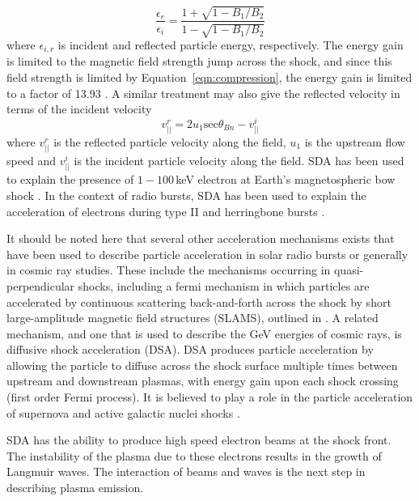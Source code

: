 \begin{equation}
\frac{\epsilon_r}{\epsilon_i} = \frac{1+\sqrt{1-B_1/B_2}}{1-\sqrt{1-B_1/B_2}}
\end{equation}
where $\epsilon_{i,r}$ is incident and reflected particle energy, respectively. The energy gain is limited to the magnetic field strength jump across the shock, and since this field strength is limited by Equation~\ref{eqn:compression}, the energy gain is limited to a factor of 13.93 \citep{ball2001}. A similar treatment may also give the reflected velocity in terms of the incident velocity \citep{holman1983}
\begin{equation}
v^r_{||} = 2u_1\mathrm{sec}\theta_{Bn} - v^i_{||}
\end{equation}
where $v^r_{||}$ is the reflected particle velocity along the field, $u_1$ is the upstream flow speed and $v^i_{||}$ is the incident particle velocity along the field. SDA has been used to explain the presence of $1-100$\,keV electron at Earth's magnetospheric bow shock \citep{wu1984}. In the context of radio bursts, SDA has been used to explain the acceleration of electrons during type II and herringbone bursts \citep{holman1983, mann2005, schmidt2012b}. 

{\color{blue}It should be noted here that several other acceleration mechanisms exists that have been used to describe particle acceleration in solar radio bursts or generally in cosmic ray studies. These include the mechanisms occurring in quasi-perpendicular shocks, including a fermi mechanism in which particles are accelerated by continuous scattering back-and-forth across the shock by short large-amplitude magnetic field structures (SLAMS), outlined in \citet{mann1994}. A related mechanism, and one that is used to describe the GeV energies of cosmic rays, is diffusive shock acceleration (DSA). DSA produces particle acceleration by allowing the particle to diffuse across the shock surface multiple times between upstream and downstream plasmas, with energy gain upon each shock crossing (first order Fermi process). It is believed to play a role in the particle acceleration of supernova and active galactic nuclei shocks \citep{drury1983}.}

SDA has the ability to produce high speed electron beams at the shock front. The instability of the plasma due to these electrons results in the growth of Langmuir waves. The interaction of beams and waves is the next step in describing plasma emission.



